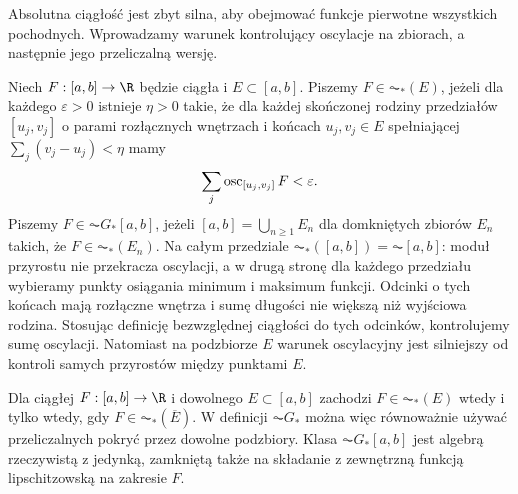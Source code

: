 Absolutna ciągłość jest zbyt silna, aby obejmować funkcje pierwotne wszystkich pochodnych. Wprowadzamy warunek kontrolujący oscylacje na zbiorach, a następnie jego przeliczalną wersję.
\begin{definicja}[$\AC_*$ i $\AC G_*$]\label{it:def:acgstar}
Niech $F:[a,b]\to\R$ będzie ciągła i $E\subset[a,b]$. Piszemy $F\in\AC_*(E)$, jeżeli dla każdego $\varepsilon>0$ istnieje $\eta>0$ takie, że dla każdej skończonej rodziny przedziałów $[u_j,v_j]$ o parami rozłącznych wnętrzach i końcach $u_j,v_j\in E$ spełniającej $\sum_j(v_j-u_j)<\eta$ mamy
\[
\sum_j\operatorname{osc}_{[u_j,v_j]}F<\varepsilon.
\]
Piszemy $F\in\AC G_*[a,b]$, jeżeli $[a,b]=\bigcup_{n\ge1}E_n$ dla domkniętych zbiorów $E_n$ takich, że $F\in\AC_*(E_n)$. Na całym przedziale $\AC_*([a,b])=\AC[a,b]$: moduł przyrostu nie przekracza oscylacji, a w drugą stronę dla każdego przedziału wybieramy punkty osiągania minimum i maksimum funkcji. Odcinki o tych końcach mają rozłączne wnętrza i sumę długości nie większą niż wyjściowa rodzina. Stosując definicję bezwzględnej ciągłości do tych odcinków, kontrolujemy sumę oscylacji. Natomiast na podzbiorze $E$ warunek oscylacyjny jest silniejszy od kontroli samych przyrostów między punktami $E$.
\end{definicja}
\begin{twierdzenie}\label{it:thm:acstar-closure-algebra}
Dla ciągłej $F:[a,b]\to\R$ i dowolnego $E\subset[a,b]$ zachodzi
$F\in\AC_*(E)$ wtedy i tylko wtedy, gdy $F\in\AC_*(\overline E)$.
W definicji $\AC G_*$ można więc równoważnie używać przeliczalnych pokryć przez dowolne podzbiory.
Klasa $\AC G_*[a,b]$ jest algebrą rzeczywistą z jedynką, zamkniętą także na składanie z zewnętrzną funkcją lipschitzowską na zakresie $F$.
\end{twierdzenie}
